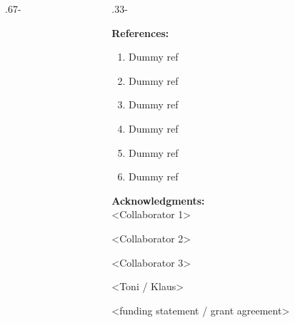 \begin{frame}[t]
\begin{columns}
\begin{column}{\hsize}
\begin{mpiblock}[Results][altBackgroundColour]
\begin{multicols}{3}
      \lipsum[9]
    
    \end{multicols}

\end{mpiblock}
  \end{column}

\end{columns}

\vspace{\mpisizevpadding}

\begin{columns}
    
  \begin{column}{.67\hsize - \tabcolsep}

    \begin{mpiblock}[Discussion]
    
      \lipsum[16]

      \vspace{1em}
      
      \lipsum[14]
    
      \vspace{0.1em}

    \end{mpiblock}
    
  \end{column}


  \begin{column}{.33\hsize - \tabcolsep}

    \begin{mpiblock}

      \textbf{References:} 
      \begin{enumerate}
        \item Dummy ref
        \item Dummy ref
        \item Dummy ref
        \item Dummy ref
        \item Dummy ref
        \item Dummy ref
      \end{enumerate}

      \vspace{1em}

      \textbf{Acknowledgments:}\\
        <Collaborator 1>\par%
        <Collaborator 2>\par%
        <Collaborator 3>\par%
        <Toni / Klaus>\par%
        <funding statement / grant agreement>


\end{mpiblock}
\end{column}
\end{columns}
\end{frame}
